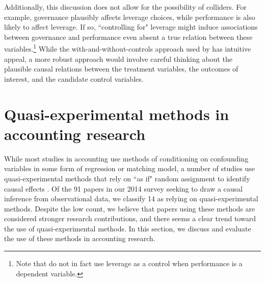 \documentclass[12pt,reqno,titlepage]{amsart}
\begin{document}
\begin{doublespace}
Additionally, this discussion does not allow for the possibility of colliders.
For example, governance plausibly affects leverage choices, while performance is also likely to affect leverage.
If so, ``controlling for" leverage might induce associations between governance and performance even absent a true relation between these variables.\footnote{
Note that \citet{Larcker:2007aa} do not in fact use leverage as a control when performance is a dependent variable.}
While the with-and-without-controls approach used by \citet{Larcker:2007aa} has intuitive appeal, a more robust approach would involve careful thinking about the plausible causal relations between the treatment variables, the outcomes of interest, and the candidate control variables.

\section{Quasi-experimental methods in accounting research} \label{sec:quasi}
While most studies in accounting use methods of conditioning on confounding variables in some form of regression or matching model, a number of studies use quasi-experimental methods that rely on ``as if" random assignment to identify causal effects \citep{Dunning:2012tt}.
Of the 91 papers in our 2014 survey seeking to draw a causal inference from observational data, we classify 14 as relying on quasi-experimental methods. Despite the low count, we believe that papers using these methods are considered stronger research contributions, and there seems a clear trend toward the use of quasi-experimental methods.
In this section, we discuss and evaluate the use of these methods in accounting research.


\end{doublespace}
\end{document}
